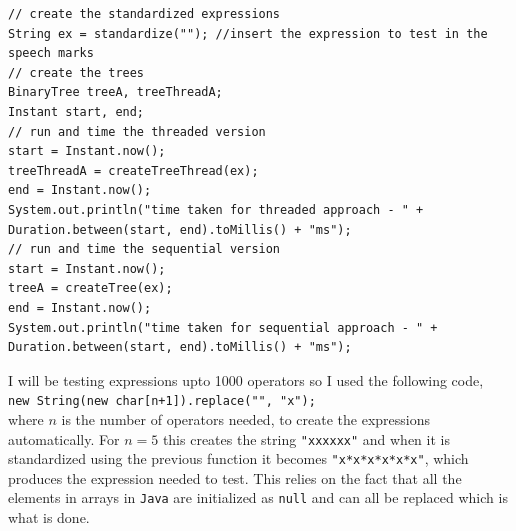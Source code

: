 \documentclass[../../../../../main.tex]{subfiles}
\begin{document}
\begin{verbatim}
// create the standardized expressions
String ex = standardize(""); //insert the expression to test in the speech marks
// create the trees
BinaryTree treeA, treeThreadA;
Instant start, end;
// run and time the threaded version
start = Instant.now();
treeThreadA = createTreeThread(ex); 
end = Instant.now();
System.out.println("time taken for threaded approach - " + Duration.between(start, end).toMillis() + "ms");
// run and time the sequential version
start = Instant.now();
treeA = createTree(ex);
end = Instant.now();
System.out.println("time taken for sequential approach - " + Duration.between(start, end).toMillis() + "ms");
\end{verbatim}
I will be testing expressions upto 1000 operators so I used the following code,\\ \texttt{new String(new char[n+1]).replace("\0", "x");}\cite{repeatCharJava}\\ where $n$ is the number of operators needed, to create the expressions automatically. For $n=5$ this creates the string \texttt{"xxxxxx"} and when it is standardized using the previous function it becomes \texttt{"x*x*x*x*x*x"},  which produces the expression needed to test. This relies on the fact that all the elements in arrays in \texttt{Java} are initialized as \texttt{null} and can all be replaced which is what is done.
\end{document}
